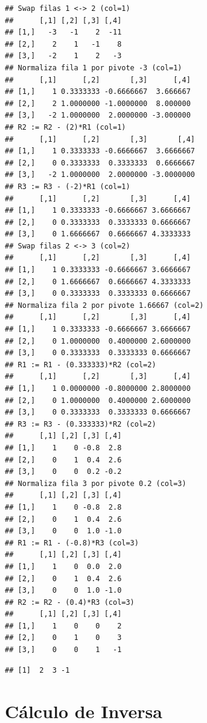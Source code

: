 \documentclass[
]{book}
\begin{document}
\begin{verbatim}
## Swap filas 1 <-> 2 (col=1)
##      [,1] [,2] [,3] [,4]
## [1,]   -3   -1    2  -11
## [2,]    2    1   -1    8
## [3,]   -2    1    2   -3
## Normaliza fila 1 por pivote -3 (col=1)
##      [,1]      [,2]       [,3]      [,4]
## [1,]    1 0.3333333 -0.6666667  3.666667
## [2,]    2 1.0000000 -1.0000000  8.000000
## [3,]   -2 1.0000000  2.0000000 -3.000000
## R2 := R2 - (2)*R1 (col=1)
##      [,1]      [,2]       [,3]       [,4]
## [1,]    1 0.3333333 -0.6666667  3.6666667
## [2,]    0 0.3333333  0.3333333  0.6666667
## [3,]   -2 1.0000000  2.0000000 -3.0000000
## R3 := R3 - (-2)*R1 (col=1)
##      [,1]      [,2]       [,3]      [,4]
## [1,]    1 0.3333333 -0.6666667 3.6666667
## [2,]    0 0.3333333  0.3333333 0.6666667
## [3,]    0 1.6666667  0.6666667 4.3333333
## Swap filas 2 <-> 3 (col=2)
##      [,1]      [,2]       [,3]      [,4]
## [1,]    1 0.3333333 -0.6666667 3.6666667
## [2,]    0 1.6666667  0.6666667 4.3333333
## [3,]    0 0.3333333  0.3333333 0.6666667
## Normaliza fila 2 por pivote 1.66667 (col=2)
##      [,1]      [,2]       [,3]      [,4]
## [1,]    1 0.3333333 -0.6666667 3.6666667
## [2,]    0 1.0000000  0.4000000 2.6000000
## [3,]    0 0.3333333  0.3333333 0.6666667
## R1 := R1 - (0.333333)*R2 (col=2)
##      [,1]      [,2]       [,3]      [,4]
## [1,]    1 0.0000000 -0.8000000 2.8000000
## [2,]    0 1.0000000  0.4000000 2.6000000
## [3,]    0 0.3333333  0.3333333 0.6666667
## R3 := R3 - (0.333333)*R2 (col=2)
##      [,1] [,2] [,3] [,4]
## [1,]    1    0 -0.8  2.8
## [2,]    0    1  0.4  2.6
## [3,]    0    0  0.2 -0.2
## Normaliza fila 3 por pivote 0.2 (col=3)
##      [,1] [,2] [,3] [,4]
## [1,]    1    0 -0.8  2.8
## [2,]    0    1  0.4  2.6
## [3,]    0    0  1.0 -1.0
## R1 := R1 - (-0.8)*R3 (col=3)
##      [,1] [,2] [,3] [,4]
## [1,]    1    0  0.0  2.0
## [2,]    0    1  0.4  2.6
## [3,]    0    0  1.0 -1.0
## R2 := R2 - (0.4)*R3 (col=3)
##      [,1] [,2] [,3] [,4]
## [1,]    1    0    0    2
## [2,]    0    1    0    3
## [3,]    0    0    1   -1
\end{verbatim}

\begin{verbatim}
## [1]  2  3 -1
\end{verbatim}

\section{Cálculo de Inversa}\label{cuxe1lculo-de-inversa}
\end{document}
